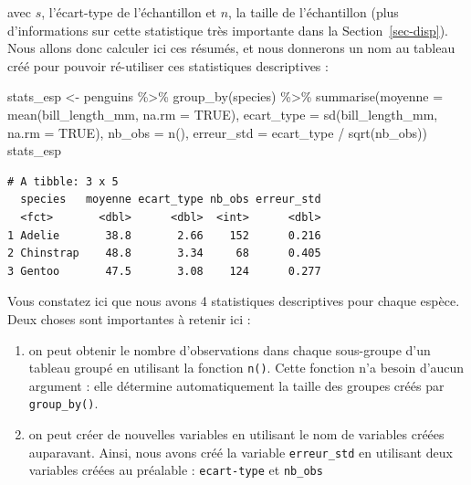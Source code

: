\documentclass[
  a4paper,
  DIV=11,
  numbers=noendperiod,
  oneside]{scrreprt}
\newenvironment{Shaded}{}{}
\newcommand{\AttributeTok}[1]{\textcolor[rgb]{0.84,0.23,0.29}{#1}}
\newcommand{\ConstantTok}[1]{\textcolor[rgb]{0.00,0.36,0.77}{#1}}
\newcommand{\FunctionTok}[1]{\textcolor[rgb]{0.44,0.26,0.76}{#1}}
\newcommand{\NormalTok}[1]{\textcolor[rgb]{0.14,0.16,0.18}{#1}}
\newcommand{\OtherTok}[1]{\textcolor[rgb]{0.44,0.26,0.76}{#1}}
\newcommand{\SpecialCharTok}[1]{\textcolor[rgb]{0.00,0.36,0.77}{#1}}
\providecommand{\tightlist}{%
  \setlength{\itemsep}{0pt}\setlength{\parskip}{0pt}}\usepackage{longtable,booktabs,array}
\begin{document}
avec \(s\), l'écart-type de l'échantillon et \(n\), la taille de
l'échantillon (plus d'informations sur cette statistique très importante
dans la Section~\ref{sec-disp}). Nous allons donc calculer ici ces
résumés, et nous donnerons un nom au tableau créé pour pouvoir
ré-utiliser ces statistiques descriptives :

\begin{Shaded}
\begin{Highlighting}[]
\NormalTok{stats\_esp }\OtherTok{\textless{}{-}}\NormalTok{ penguins }\SpecialCharTok{\%\textgreater{}\%}
  \FunctionTok{group\_by}\NormalTok{(species) }\SpecialCharTok{\%\textgreater{}\%}
  \FunctionTok{summarise}\NormalTok{(}\AttributeTok{moyenne =} \FunctionTok{mean}\NormalTok{(bill\_length\_mm, }\AttributeTok{na.rm =} \ConstantTok{TRUE}\NormalTok{),}
            \AttributeTok{ecart\_type =} \FunctionTok{sd}\NormalTok{(bill\_length\_mm, }\AttributeTok{na.rm =} \ConstantTok{TRUE}\NormalTok{),}
            \AttributeTok{nb\_obs =} \FunctionTok{n}\NormalTok{(),}
            \AttributeTok{erreur\_std =}\NormalTok{ ecart\_type }\SpecialCharTok{/} \FunctionTok{sqrt}\NormalTok{(nb\_obs))}
\NormalTok{stats\_esp}
\end{Highlighting}
\end{Shaded}

\begin{verbatim}
# A tibble: 3 x 5
  species   moyenne ecart_type nb_obs erreur_std
  <fct>       <dbl>      <dbl>  <int>      <dbl>
1 Adelie       38.8       2.66    152      0.216
2 Chinstrap    48.8       3.34     68      0.405
3 Gentoo       47.5       3.08    124      0.277
\end{verbatim}

Vous constatez ici que nous avons 4 statistiques descriptives pour
chaque espèce. Deux choses sont importantes à retenir ici :

\begin{enumerate}
\def\labelenumi{\arabic{enumi}.}
\tightlist
\item
  on peut obtenir le nombre d'observations dans chaque sous-groupe d'un
  tableau groupé en utilisant la fonction \texttt{n()}. Cette fonction
  n'a besoin d'aucun argument : elle détermine automatiquement la taille
  des groupes créés par \texttt{group\_by()}.
\item
  on peut créer de nouvelles variables en utilisant le nom de variables
  créées auparavant. Ainsi, nous avons créé la variable
  \texttt{erreur\_std} en utilisant deux variables créées au préalable :
  \texttt{ecart-type} et \texttt{nb\_obs}
\end{enumerate}
\end{document}
